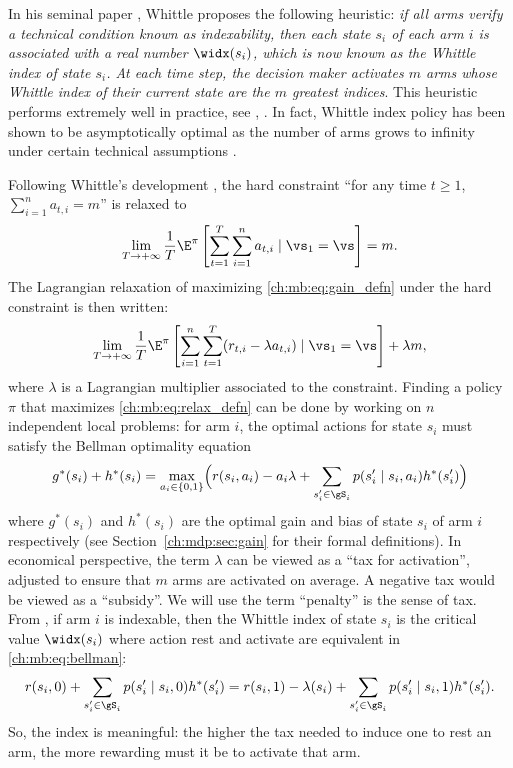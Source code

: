 In his seminal paper \cite{whittle1988restless}, Whittle proposes the following heuristic: \textit{if all arms verify a technical condition known as indexability, then each state $s_i$ of each arm $i$ is associated with a real number $\widx(s_i)$, which is now known as the Whittle index of state $s_i$.
At each time step, the decision maker activates $m$ arms whose Whittle index of their current state are the $m$ greatest indices}.
This heuristic performs extremely well in practice, see \eg, \cite{glazebrook2002index, ansell2003whittle, glazebrook2006some}.
In fact, Whittle index policy has been shown to be asymptotically optimal as the number of arms grows to infinity under certain technical assumptions \cite{weber1990index, lott2000optimality, verloop2016asymptotically}.

Following Whittle's development \cite{whittle1988restless}, the hard constraint ``for any time $t\ge1$, $\sum_{i=1}^{n}a_{t,i}=m$'' is relaxed to
\begin{align*}
    \lim_{T\to+\infty}\frac1T \E^\pi\left[\sum_{t=1}^{T} \sum_{i=1}^n a_{t,i} \mid \vs_1=\vs\right]=m.
\end{align*}
The Lagrangian relaxation of maximizing \eqref{ch:mb:eq:gain_defn} under the hard constraint is then written:
\begin{align}
    \lim_{T\to+\infty}\frac1T \E^\pi\left[\sum_{i=1}^n \sum_{t=1}^{T} (r_{t,i} -\lambda a_{t,i}) \mid \vs_1=\vs\right] +\lambda m, \label{ch:mb:eq:relax_defn}
\end{align}
where $\lambda$ is a Lagrangian multiplier associated to the constraint.
Finding a policy $\pi$ that maximizes \eqref{ch:mb:eq:relax_defn} can be done by working on $n$ independent local problems:
for arm $i$, the optimal actions for state $s_i$ must satisfy the Bellman optimality equation
\begin{align}
    g^*(s_i) +h^*(s_i) =\max_{a_i\in\{0,1\}} \Bigl(r(s_i,a_i)-a_i\lambda +\sum_{s'_i\in\gS_i}p(s'_i\mid s_i,a_i)h^*(s'_i)\Bigr) \label{ch:mb:eq:bellman}
\end{align}
where $g^*(s_i)$ and $h^*(s_i)$ are the optimal gain and bias of state $s_i$ of arm $i$ respectively (see Section~\ref{ch:mdp:sec:gain} for their formal definitions).
In economical perspective, the term $\lambda$ can be viewed as a ``tax for activation'', adjusted to ensure that $m$ arms are activated on average.
A negative tax would be viewed as a ``subsidy''.
We will use the term ``penalty'' is the sense of tax.
From \cite{whittle1988restless,whittle1996optimal}, if arm $i$ is indexable, then the Whittle index of state $s_i$ is the critical value $\widx(s_i)$ where action rest and activate are equivalent in \eqref{ch:mb:eq:bellman}:
\begin{align}
    r(s_i,0) +\sum_{s'_i\in\gS_i}p(s'_i\mid s_i,0)h^*(s'_i)
    =r(s_i,1)-\lambda(s_i) +\sum_{s'_i\in\gS_i}p(s'_i\mid s_i,1)h^*(s'_i). \label{ch:mb:eq:widx_defn}
\end{align}
So, the index is meaningful: the higher the tax needed to induce one to rest an arm, the more rewarding must it be to activate that arm.

